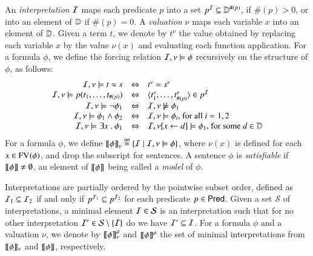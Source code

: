 \documentclass{llncs}
\begin{document}

An \emph{interpretation} $\mathcal{I}$ maps each predicate $p$ into a set $p^{\mathcal{I}}
\subseteq \mathbb{D}^{\#(p)}$, if $\#(p)>0$, or into an element of $\mathbb{D}$
if $\#(p)=0$. A \emph{valuation} $\nu$ maps each variable $x$ into an
element of $\mathbb{D}$. Given a term $t$, we denote by $t^\nu$ the value
obtained by replacing each variable $x$ by the value $\nu(x)$ and
evaluating each function application. For a formula $\phi$, we define
the forcing relation $\mathcal{I},\nu \models \phi$ recursively on the
structure of $\phi$, as follows:
\[
\begin{array}{rcl}
\mathcal{I},\nu \models t \approx s & \Leftrightarrow & t^\nu=s^\nu \\
\mathcal{I},\nu \models p(t_1,\ldots,t_{\#(p)}) & \Leftrightarrow & \langle t_1^\nu,\ldots,t_{\#(p)}^\nu \rangle \in p^{\mathcal{I}} \\
\mathcal{I},\nu \models \neg\phi_1 & \Leftrightarrow & \mathcal{I},\nu \not\models \phi_1 \\
\mathcal{I},\nu \models \phi_1 \wedge \phi_2 & \Leftrightarrow & \mathcal{I},\nu \models \phi_i \text{, for all } i=1,2 \\ 
\mathcal{I},\nu \models \exists x ~.~ \phi_1 & \Leftrightarrow & \mathcal{I},\nu[x\leftarrow d] \models \phi_1 \text{, for some } d \in \mathbb{D} 
\end{array}
\]
For a formula $\phi$, we define ${\bf [\![} \phi {\bf ]\!]}_\nu \stackrel{\scriptscriptstyle{\mathsf{def}}}{=} \{ \mathcal{I} \mid
  \mathcal{I},\nu \models \phi \}$, where $\nu(x)$ is defined for each $x \in
\mathrm{FV}_{}(\phi)$, and drop the subscript for sentences. A sentence $\phi$
is \emph{satisfiable} if ${\bf [\![} \phi {\bf ]\!]}\neq\emptyset$, an element of
${\bf [\![} \phi {\bf ]\!]}$ being called a \emph{model} of $\phi$.

Interpretations are partially ordered by the pointwise subset order,
defined as $\mathcal{I}_1 \subseteq \mathcal{I}_2$ if and only if $p^{\mathcal{I}_1} \subseteq
p^{\mathcal{I}_2}$ for each predicate $p \in \mathsf{Pred}$. Given a set $\mathcal{S}$
of interpretations, a minimal element $\mathcal{I} \in \mathcal{S}$ is an
interpretation such that for no other interpretation $\mathcal{I}' \in
\mathcal{S} \setminus \{ \mathcal{I} \}$ do we have $\mathcal{I}' \subseteq \mathcal{I}$. For a
formula $\phi$ and a valuation $\nu$, we denote by ${\bf [\![} \phi {\bf ]\!]}^\mu_\nu$
and ${\bf [\![} \phi {\bf ]\!]}^\mu$ the set of minimal interpretations from
${\bf [\![} \phi {\bf ]\!]}_\nu$ and ${\bf [\![} \phi {\bf ]\!]}$, respectively.
\end{document}
